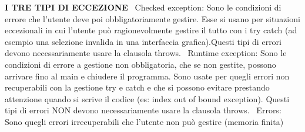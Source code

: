 \noindent \textbf{I TRE TIPI DI ECCEZIONE} \newline
\textbullet\ Checked exception: Sono le condizioni di errore che l'utente deve poi obbligatoriamente gestire. Esse si usano per situazioni eccezionali in cui l'utente può ragionevolmente gestire il tutto con i try catch (ad esempio una selezione invalida in una interfaccia grafica).Questi tipi di errori devono necessariamente usare la clausola throws. \newline
\textbullet\ Runtime exception: Sono le condizioni di errore a gestione non obbligatoria, che se non gestite, possono arrivare fino al main e chiudere il programma. Sono usate per quegli errori non recuperabili con la gestione try e catch e che si possono evitare prestando attenzione quando si scrive il codice (es: index out of bound exception). Questi tipi di errori NON devono necessariamente usare la clausola throws.\newline
\textbullet\ Errors: Sono quegli errori irrecuperabili che l'utente non può gestire (memoria finita) \newline
\newpage






